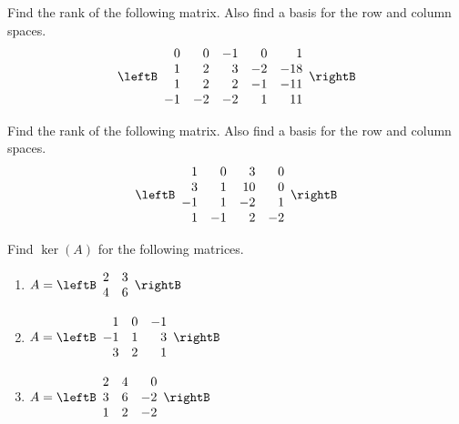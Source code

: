 \begin{enumialphparenastyle}
\begin{ex} Find the rank of the following matrix. Also find a basis for the row
and column spaces. 
\begin{equation*}
\leftB 
\begin{array}{rrrrr}
0 & 0 & -1 & 0 & 1 \\ 
1 & 2 & 3 & -2 & -18 \\ 
1 & 2 & 2 & -1 & -11 \\ 
-1 & -2 & -2 & 1 & 11
\end{array}
\rightB
\end{equation*}
\end{ex}

\begin{ex} Find the rank of the following matrix. Also find a basis for the row
and column spaces.
\begin{equation*}
\leftB 
\begin{array}{rrrr}
1 & 0 & 3 & 0 \\ 
3 & 1 & 10 & 0 \\ 
-1 & 1 & -2 & 1 \\ 
1 & -1 & 2 & -2
\end{array}
\rightB
\end{equation*}
\end{ex}

\begin{ex} Find $\ker \left(A \right)$ for the following matrices. 

\begin{enumerate}
\item 
$A = \leftB \begin{array}{rr}
2 & 3 \\
4 & 6 
\end{array} \rightB $

\item
$A = \leftB \begin{array}{rrr}
1 & 0 & -1 \\
-1 & 1 & 3 \\
3 & 2 & 1 
\end{array} \rightB$

\item 
$A = \leftB \begin{array}{rrr}
2 & 4 & 0 \\
3 & 6 & -2 \\
1 & 2 & -2
\end{array} \rightB$ 


\end{enumerate}
\end{ex}
\end{enumialphparenastyle}
